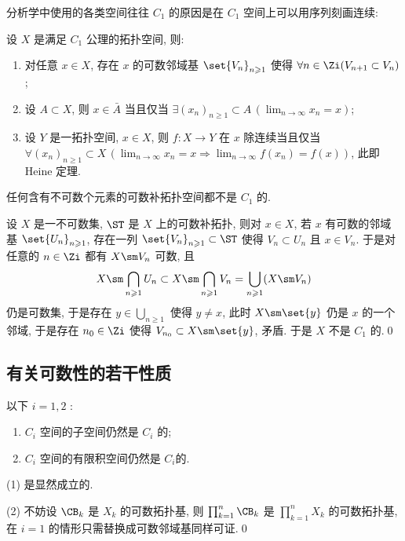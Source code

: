     分析学中使用的各类空间往往 $ C_1 $ 的原因是在 $ C_1 $ 空间上可以用序列刻画连续:

    \begin{Proposition}
        设 $ X $ 是满足 $ C_1 $ 公理的拓扑空间, 则:
        \begin{enumerate}
            \item 对任意 $ x\in X $, 存在 $ x $ 的可数邻域基 $ \set{V_n}_{n\geqslant 1} $ 使得 $ \forall n\in\Zi(V_{n+1}\subset V_n) $;
            \item 设 $ A\subset X $, 则 $ x\in\bar{A} $ 当且仅当 $ \exists(x_n)_{n\geqslant 1}\subset A\,(\lim_{n\to\infty}x_n=x) $;
            \item 设 $ Y $ 是一拓扑空间, $ x\in X $, 则 $ f : X\to Y $ 在 $ x $ 除连续当且仅当 $ \forall (x_n)_{n\geqslant 1}\subset X\,(\lim_{n\to\infty}x_n=x\Rightarrow\lim_{n\to\infty}f(x_n)=f(x)) $, 此即 Heine 定理.
        \end{enumerate}
    \end{Proposition}

    \begin{Example}[非 $ C_1 $ 空间]
        任何含有不可数个元素的可数补拓扑空间都不是 $ C_1 $ 的.
    \end{Example}
    \begin{Proof}
        设 $ X $ 是一不可数集, $ \ST $ 是 $ X $ 上的可数补拓扑, 则对 $ x\in X $, 若 $ x $ 有可数的邻域基 $ \set{U_n}_{n\geqslant 1} $, 存在一列 $ \set{V_n}_{n\geqslant 1}\subset\ST $ 使得 $ V_n\subset U_n $ 且 $ x\in V_n $. 于是对任意的 $ n\in\Zi $ 都有 $ X\sm V_n $ 可数, 且
        \[
            X\sm\bigcap_{n\geqslant 1}U_n\subset X\sm\bigcap_{n\geqslant 1}V_n=\bigcup_{n\geqslant 1}(X\sm V_n)
        \]
        仍是可数集, 于是存在 $ y\in\bigcup_{n\geqslant 1} $ 使得 $ y\ne x $, 此时 $ X\sm\set{y} $ 仍是 $ x $ 的一个邻域, 于是存在 $ n_0\in\Zi $ 使得 $ V_{n_0}\subset X\sm\set{y} $, 矛盾. 于是 $ X $ 不是 $ C_1 $ 的.\qed
    \end{Proof}

\subsection{有关可数性的若干性质}

    \begin{Proposition}
        以下 $ i=1,2 $ :
        \begin{enumerate}
            \item $ C_i $ 空间的子空间仍然是 $ C_i $ 的;
            \item $ C_i $ 空间的有限积空间仍然是 $ C_i $的.
        \end{enumerate}
    \end{Proposition}
    \begin{Proof}
        (1) 是显然成立的.

        (2) 不妨设 $ \CB_k $ 是 $ X_k $ 的可数拓扑基, 则 $ \prod_{k=1}^n\CB_k $ 是 $ \prod_{k=1}^nX_k $ 的可数拓扑基, 在 $ i=1 $ 的情形只需替换成可数邻域基同样可证.\qed
    \end{Proof}

